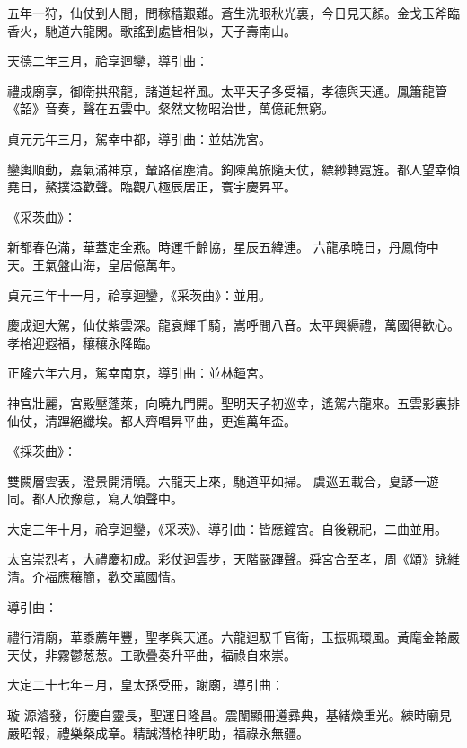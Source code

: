\begin{pinyinscope}
 五年一狩，仙仗到人間，問稼穡艱難。蒼生洗眼秋光裏，今日見天顏。金戈玉斧臨香火，馳道六龍閑。歌謠到處皆相似，天子壽南山。



 天德二年三月，祫享迴鑾，導引曲：



 禮成廟享，御衛拱飛龍，諸道起祥風。太平天子多受福，孝德與天通。鳳簫龍管《韶》音奏，聲在五雲中。粲然文物昭治世，萬億祀無窮。



 貞元元年三月，駕幸中都，導引曲：並姑洗宮。



 鑾輿順動，嘉氣滿神京，輦路宿塵清。鉤陳萬旅隨天仗，縹緲轉霓旌。都人望幸傾堯日，鰲撲溢歡聲。臨觀八極辰居正，寰宇慶昇平。



 《采茨曲》：



 新都春色滿，華蓋定全燕。時運千齡協，星辰五緯連。
 六龍承曉日，丹鳳倚中天。王氣盤山海，皇居億萬年。



 貞元三年十一月，祫享迴鑾，《采茨曲》：並用。



 慶成迴大駕，仙仗紫雲深。龍袞輝千騎，嵩呼間八音。太平興縟禮，萬國得歡心。孝格迎遐福，穰穰永降臨。



 正隆六年六月，駕幸南京，導引曲：並林鐘宮。



 神宮壯麗，宮殿壓蓬萊，向曉九門開。聖明天子初巡幸，遙駕六龍來。五雲影裏排仙仗，清蹕絕纖埃。都人齊唱昇平曲，更進萬年盃。



 《採茨曲》：



 雙闕層雲表，澄景開清曉。六龍天上來，馳道平如掃。
 虞巡五載合，夏諺一遊同。都人欣豫意，寫入頌聲中。



 大定三年十月，祫享迴鑾，《采茨》、導引曲：皆應鐘宮。自後親祀，二曲並用。



 太宮崇烈考，大禮慶初成。彩仗迴雲步，天階嚴蹕聲。舜宮合至孝，周《頌》詠維清。介福應穰簡，歡交萬國情。



 導引曲：



 禮行清廟，華黍薦年豐，聖孝與天通。六龍迴馭千官衛，玉振珮環風。黃麾金輅嚴天仗，非霧鬱葱葱。工歌疊奏升平曲，福祿自來崇。



 大定二十七年三月，皇太孫受冊，謝廟，導引曲：



 璇
 源濬發，衍慶自靈長，聖運日隆昌。震闈顯冊遵彞典，基緒煥重光。練時廟見嚴昭報，禮樂粲成章。精誠潛格神明助，福祿永無疆。



\end{pinyinscope}